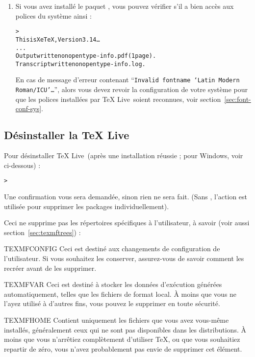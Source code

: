 \documentclass[german, english, french, 12pt]{article}
\renewcommand{\samp}[1]{\enquote{\texttt{#1}}}
\renewcommand{\TL}{\TeX{} Live\xspace}%
\begin{document}
\begin{enumerate}
\item Si vous avez installé le paquet , vous pouvez vérifier s'il
  a bien accès aux polices du système ainsi :
  \begin{alltt}
> 
This is XeTeX, Version 3.14\dots
...
Output written on opentype-info.pdf (1 page).
Transcript written on opentype-info.log.
\end{alltt}

En cas de message d'erreur contenant \samp{Invalid fontname `Latin Modern
  Roman/ICU'\dots}, alors vous devez revoir la configuration de votre système
pour que les polices installées par \TL\ soient reconnues, voir
section~\ref{sec:font-conf-sys}.

\end{enumerate}

\subsection{Désinstaller la \TL}
\label{sec:uninstall}

Pour désinstaller \TL\ (après une installation réussie ; pour Windows, voir
ci-dessous) :

\begin{alltt}
> 
\end{alltt}

Une confirmation vous sera demandée, sinon rien ne sera fait.  (Sans
, l'action  est utilisée pour supprimer les
packages individuellement).

Ceci ne supprime pas les répertoires spécifiques à l'utilisateur, à savoir (voir
aussi section~\ref{sec:texmftrees}) :

\begin{ttdescription}
\item [TEXMFCONFIG] Ceci est destiné aux changements de configuration de
  l'utilisateur.  Si vous souhaitez les conserver, assurez-vous de savoir
  comment les recréer avant de les supprimer.

\item [TEXMFVAR] Ceci est destiné à stocker les données d'exécution générées
  automatiquement, telles que les fichiers de format local. À moins que vous ne
  l'ayez utilisé à d'autres fins, vous pouvez le supprimer en toute sécurité.

\item [TEXMFHOME] Contient uniquement les fichiers que vous avez vous-même
  installés, généralement ceux qui ne sont pas disponibles dans les
  distributions. À moins que vous n'arrêtiez complètement d'utiliser \TeX, ou
  que vous souhaitiez repartir de zéro, vous n'avez probablement pas envie de
  supprimer cet élément.

\end{ttdescription}
\end{document}
